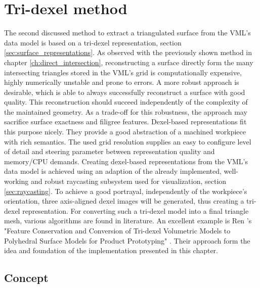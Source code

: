 
\chapter{Tri-dexel method}
\label{ch:tri_dexel}

The second discussed method to extract a triangulated surface from the VML's data model is based on a tri-dexel representation, \cf section \ref{sec:surface_representations}.
As observed with the previously shown method in chapter \ref{ch:direct_intersection}, reconstructing a surface directly form the many intersecting triangles stored in the VML's grid is computationally expensive, highly numerically unstable and prone to errors.
A more robust approach is desirable, which is able to always successfully reconstruct a surface with good quality.
This reconstruction should succeed independently of the complexity of the maintained geometry.
As a trade-off for this robustness, the approach may sacrifice surface exactness and filigree features.
Dexel-based representations fit this purpose nicely.
They provide a good abstraction of a machined workpiece with rich semantics.
The used grid resolution supplies an easy to configure level of detail and steering parameter between representation quality and memory/CPU demands.
Creating dexel-based representations from the VML's data model is achieved using an adaption of the already implemented, well-working and robust raycasting subsystem used for visualization, \cf section \ref{sec:raycasting}.
To achieve a good portrayal, independently of the workpiece's orientation, three axis-aligned dexel images will be generated, thus creating a tri-dexel representation.
For converting such a tri-dexel model into a final triangle mesh, various algorithms are found in literature.
An excellent example is Ren \etal's "Feature Conservation and Conversion of Tri-dexel Volumetric Models to Polyhedral Surface Models for Product Prototyping" \cite{tridexel_reconstruction}.
Their approach form the idea and foundation of the implementation presented in this chapter.


\section{Concept}
\label{sec:tri_dexel_concept}


